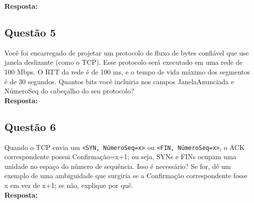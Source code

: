 \noindent
\textbf{Resposta:}

\subsection{Questão 5}
Você foi encarregado de projetar um protocolo de fluxo de bytes confiável que use janela
deslizante (como o TCP). Esse protocolo será executado em uma rede de 100 Mbps. O RTT da
rede é de 100 ms, e o tempo de vida máximo dos segmentos é de 30 segundos.
Quantos bits você incluiria nos campos JanelaAnunciada e NúmeroSeq do cabeçalho do seu
protocolo?\\

\noindent
\textbf{Resposta:}

\subsection{Questão 6}
Quando o TCP envia um \texttt{<SYN, NúmeroSeq=x>} ou \texttt{<FIN, NúmeroSeq=x>}, o ACK correspondente
possui Confirmação=x+1; ou seja, SYNs e FINs ocupam uma unidade no espaço do número
de sequência. Isso é necessário? Se for, dê um exemplo de uma ambiguidade que surgiria se a
Confirmação correspondente fosse x em vez de x+1; se não, explique por quê.\\

\noindent
\textbf{Resposta:}